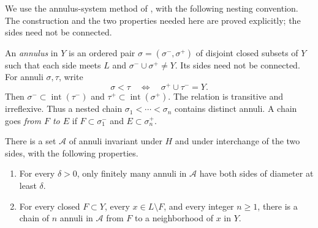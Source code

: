 We use the annulus-system method of
\cite[Sections~6--7]{Bowditch1998Topological}, with the following
nesting convention. The construction and the two properties needed
here are proved explicitly; the sides need not be connected.

An \emph{annulus} in $Y$ is an ordered pair
$\sigma=(\sigma^-,\sigma^+)$ of disjoint closed subsets of $Y$ such
that each side meets $L$ and $\sigma^-\cup\sigma^+\ne Y$. Its sides
need not be connected. For annuli $\sigma,\tau$, write
\[
  \sigma<\tau\quad\Longleftrightarrow\quad
  \sigma^+\cup\tau^-=Y.
\]
Then $\sigma^-\subset\operatorname{int}(\tau^-)$ and
$\tau^+\subset\operatorname{int}(\sigma^+)$. The relation is transitive
and irreflexive. Thus a nested chain
$\sigma_1<\cdots<\sigma_n$ contains distinct annuli.
A chain goes \emph{from $F$ to $E$} if
$F\subset\sigma_1^-$ and $E\subset\sigma_n^+$.

\begin{lemma}\label{ann:system}
There is a set $\mathcal A$ of annuli invariant under $H$ and under
interchange of the two sides, with the following properties.
\begin{enumerate}
\item For every $\delta>0$, only finitely many annuli in $\mathcal A$
have both sides of diameter at least $\delta$.
\item For every closed $F\subset Y$, every $x\in L\setminus F$, and
every integer $n\geq1$, there is a chain of $n$ annuli in $\mathcal A$
from $F$ to a neighborhood of $x$ in $Y$.
\end{enumerate}
\end{lemma}

